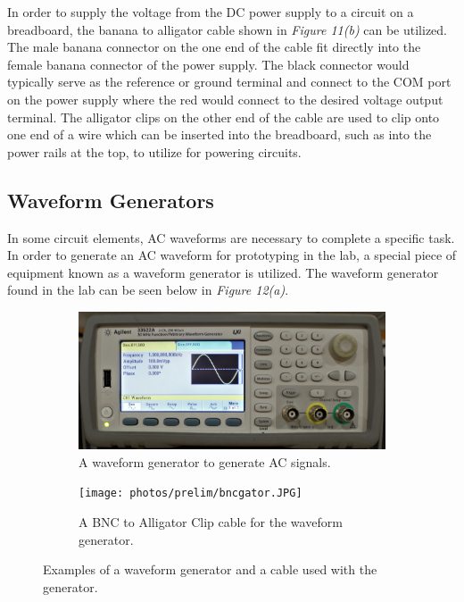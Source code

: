 \documentclass[12pt]{article}
\begin{document}
In order to supply the voltage from the DC power supply to a circuit on a breadboard, the banana to alligator cable shown in \textit{Figure 11(b)} can be utilized. The male banana connector on the one end of the cable fit directly into the female banana connector of the power supply. The black connector would typically serve as the reference or ground terminal and connect to the COM port on the power supply where the red would connect to the desired voltage output terminal. The alligator clips on the other end of the cable are used to clip onto one end of a wire which can be inserted into the breadboard, such as into the power rails at the top, to utilize for powering circuits.

\subsection{Waveform Generators}

In some circuit elements, AC waveforms are necessary to complete a specific task. In order to generate an AC waveform for prototyping in the lab, a special piece of equipment known as a waveform generator is utilized. The waveform generator found in the lab can be seen below in \textit{Figure 12(a)}.

\begin{figure}[H]
\begin{subfigure}{.5\textwidth}
    \centering
    \includegraphics[width=1\linewidth]{photos/prelim/wavegen.jpg}
    \caption{A waveform generator to generate AC signals.}
\end{subfigure}%
\begin{subfigure}{.5\textwidth}
  \centering
  \texttt{[image: photos/prelim/bncgator.JPG]}
  \caption{A BNC to Alligator Clip cable for the waveform generator.}
\end{subfigure}
\caption{Examples of a waveform generator and a cable used with the generator.}
\end{figure}
\end{document}
